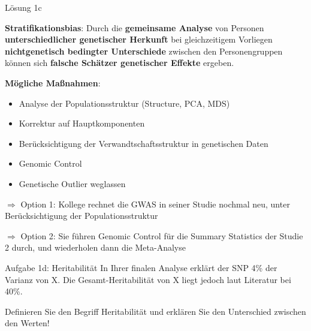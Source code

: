\documentclass{beamer}
\begin{document}
\begin{frame}{Lösung 1c}

\textbf{Stratifikationsbias}: Durch die \textbf{gemeinsame Analyse} von Personen \textbf{unterschiedlicher genetischer Herkunft} bei gleichzeitigem Vorliegen \textbf{nichtgenetisch bedingter Unterschiede} zwischen den Personengruppen können sich \textbf{falsche Schätzer genetischer Effekte} ergeben. 

\textbf{Mögliche Maßnahmen}:

\begin{itemize}
    \item Analyse der Populationsstruktur (Structure, PCA, MDS)
    \item Korrektur auf Hauptkomponenten
    \item Berücksichtigung der Verwandtschaftsstruktur in genetischen Daten 
    \item Genomic Control 
    \item Genetische Outlier weglassen
\end{itemize}

$\Rightarrow$ Option 1: Kollege rechnet die GWAS in seiner Studie nochmal neu, unter Berücksichtigung der Populationsstruktur

$\Rightarrow$ Option 2: Sie führen Genomic Control für die Summary Statistics der Studie 2 durch, und wiederholen dann die Meta-Analyse

\end{frame}

\begin{frame}{Aufgabe 1d: Heritabilität}
In Ihrer finalen Analyse erklärt der SNP 4\% der Varianz von X. Die Gesamt-Heritabilität von X liegt jedoch laut Literatur bei 40\%.

Definieren Sie den Begriff Heritabilität und erklären Sie den Unterschied zwischen den Werten!
\end{frame}
\end{document}
